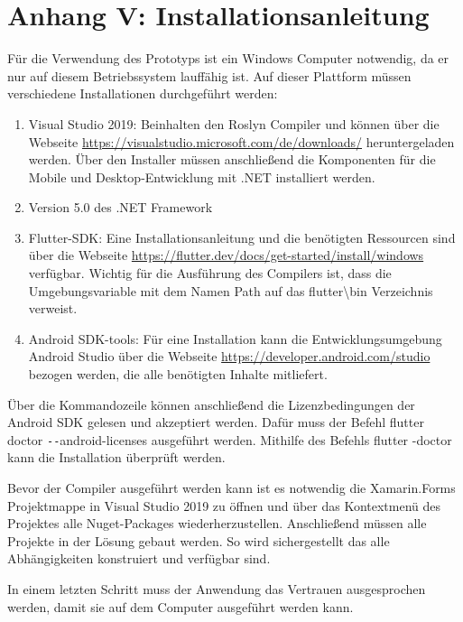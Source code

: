 \chapter{Anhang V: Installationsanleitung}
\label{chap:Installationsanleitung}

Für die Verwendung des Prototyps ist ein Windows Computer notwendig,  da er nur auf diesem Betriebssystem lauffähig ist.  
Auf dieser Plattform müssen verschiedene Installationen durchgeführt werden:

\begin{enumerate}
\setlength\itemsep{-0.6em}
	\item Visual Studio 2019: Beinhalten den Roslyn Compiler und können über die Webseite \url{https://visualstudio.microsoft.com/de/downloads/} heruntergeladen werden.  Über den Installer müssen anschließend die Komponenten für die Mobile und Desktop-Entwicklung mit .NET installiert werden.	
	\item Version 5.0 des .NET Framework
	\item Flutter-SDK:  Eine Installationsanleitung und die benötigten Ressourcen sind über die Webseite \url{https://flutter.dev/docs/get-started/install/windows} verfügbar.  Wichtig für die Ausführung des Compilers ist,  dass die Umgebungsvariable mit dem Namen \glq Path\grq{}  auf das \glqq flutter\textbackslash bin\grqq{} Verzeichnis verweist. 
	\item Android SDK-tools: Für eine Installation kann die Entwicklungsumgebung Android Studio über die Webseite \url{https://developer.android.com/studio} bezogen werden,  die alle benötigten Inhalte mitliefert. 
 
\end{enumerate}


Über die Kommandozeile können anschließend die Lizenzbedingungen der Android SDK gelesen und akzeptiert werden.  Dafür muss der Befehl \glqq flutter doctor \texttt{-{}-}android-licenses\grqq{} ausgeführt werden.  Mithilfe des  Befehls \glqq flutter -doctor\grqq{} kann die Installation überprüft werden.

Bevor der Compiler ausgeführt werden kann ist es notwendig die Xamarin.Forms Projektmappe in Visual Studio 2019 zu öffnen und über das Kontextmenü des Projektes alle Nuget-Packages wiederherzustellen.  Anschließend müssen alle Projekte in der Lösung gebaut werden.  So wird sichergestellt das alle Abhängigkeiten konstruiert und verfügbar sind. 

In einem letzten Schritt muss der Anwendung das Vertrauen ausgesprochen werden, damit sie auf dem Computer ausgeführt werden kann.
